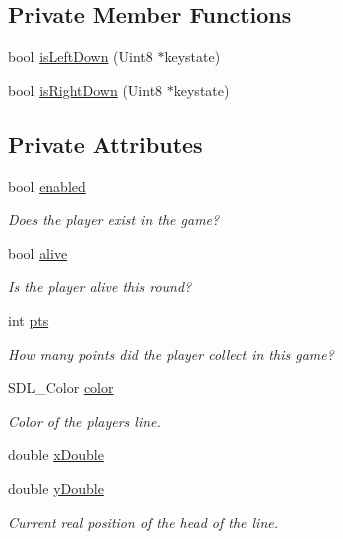 \subsection*{Private Member Functions}
\begin{DoxyCompactItemize}
\item 
bool \hyperlink{classPlayer_a8da85329252ffcf7f2d14d491620d556}{is\+Left\+Down} (Uint8 $\ast$keystate)
\item 
bool \hyperlink{classPlayer_a2c41374b79283937fb1bfdab3369c42d}{is\+Right\+Down} (Uint8 $\ast$keystate)
\end{DoxyCompactItemize}
\subsection*{Private Attributes}
\begin{DoxyCompactItemize}
\item 
bool \hyperlink{classPlayer_a86ca9b85a70bf78c6109c728f311ca8c}{enabled}
\begin{DoxyCompactList}\small\item\em Does the player exist in the game? \end{DoxyCompactList}\item 
bool \hyperlink{classPlayer_af6ac9227d5db4826d9a0fa697681e469}{alive}
\begin{DoxyCompactList}\small\item\em Is the player alive this round? \end{DoxyCompactList}\item 
int \hyperlink{classPlayer_a3b5be83653107f1c320463a6645b5716}{pts}
\begin{DoxyCompactList}\small\item\em How many points did the player collect in this game? \end{DoxyCompactList}\item 
S\+D\+L\+\_\+\+Color \hyperlink{classPlayer_ad2ac07f900cc99b0248c36ef083f778f}{color}
\begin{DoxyCompactList}\small\item\em Color of the player\textquotesingle{}s line. \end{DoxyCompactList}\item 
double \hyperlink{classPlayer_a7fe7124fd9eeb4bca23da301b913cdd3}{x\+Double}
\item 
double \hyperlink{classPlayer_a10fdd50d5dd7c1bb4799f8f40e505a76}{y\+Double}
\begin{DoxyCompactList}\small\item\em Current real position of the head of the line. \end{DoxyCompactList}\item 

\end{DoxyCompactItemize}
